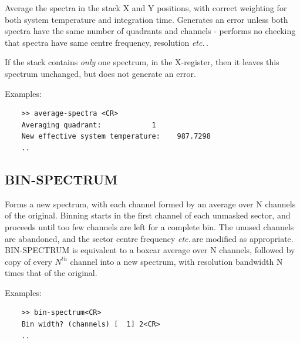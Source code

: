 \documentclass[11pt,twoside]{report}
\newcommand{\etc}{{\it etc.\,}}
\begin{document}
Average the spectra in the stack X and Y positions, with correct weighting
for both system temperature and integration time. Generates an error unless
both spectra have the same number of quadrants and channels - performs no
checking that spectra have same centre frequency, resolution \etc.

If the stack contains {\em only} one spectrum, in the X-register, then it
leaves this spectrum unchanged, but does not generate an error.

Examples:
\begin{verbatim}
    >> average-spectra <CR>
    Averaging quadrant:            1
    New effective system temperature:    987.7298
    ..
\end{verbatim}

\subsection{BIN-SPECTRUM} 

Forms a new spectrum, with each channel formed by an average over N channels of
the original. Binning starts in the first channel of each unmasked sector, and
proceeds until too few channels are left for a complete bin. The unused
channels are abandoned, and the sector centre frequency \etc are modified as
appropriate. BIN-SPECTRUM is equivalent to a boxcar average over N channels,
followed by copy of every $N^{th}$ channel into a new spectrum, with resolution
bandwidth N times that of the original.

Examples:
\begin{verbatim}
    >> bin-spectrum<CR>
    Bin width? (channels) [  1] 2<CR>
    ..
\end{verbatim}
\end{document}
